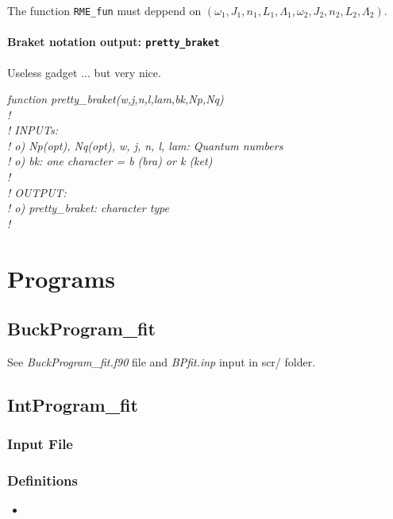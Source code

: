 \documentclass[english,twoside, openright]{report}
\begin{document}
  The function \texttt{RME\_fun} must deppend on
  $\left(\omega_1,J_1,n_1,L_1,\Lambda_1,\omega_2,J_2,n_2,L_2,\Lambda_2\right)$.

  \subsubsection{Braket notation output: \texttt{pretty\_braket}}
  
  Useless gadget ... but very nice.

  \vbox{\em
    function pretty\_braket(w,j,n,l,lam,bk,Np,Nq) \\
    ! \\
    ! INPUTs:\\
    !        o) Np(opt), Nq(opt), w, j, n, l, lam: Quantum numbers \\
    !        o) bk: one character = b (bra) or k (ket) \\
    !\\
    ! OUTPUT: \\
    !        o) pretty\_braket: character type \\
    ! \\
  }


  \chapter{Programs}
  \section{BuckProgram\_fit}
  See {\em BuckProgram\_fit.f90} file and {\em BPfit.inp} input in
  {\rm scr/} folder.

  \section{IntProgram\_fit}
  \subsection{Input File}
  \subsection{Definitions}
  \begin{itemize}
  \item 
  \end{itemize}
  
\end{document}
